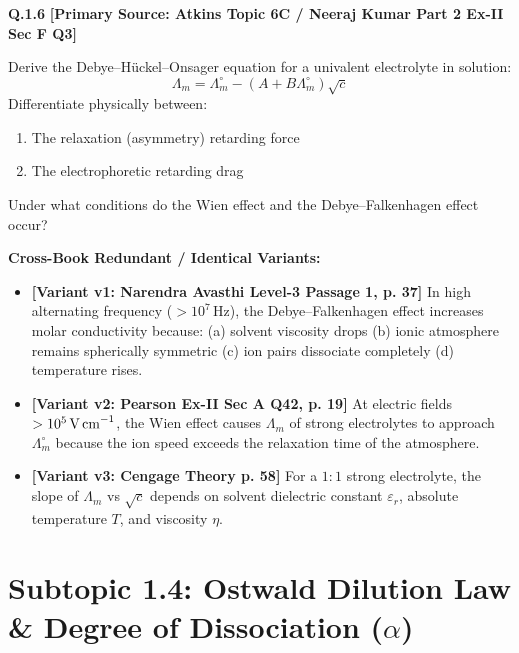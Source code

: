 \begin{problembox}
\textbf{Q.1.6} \hfill \textbf{[Primary Source: Atkins Topic 6C / Neeraj Kumar Part 2 Ex-II Sec F Q3]}
\label{q:qb-c1-06}

Derive the Debye--H\"{u}ckel--Onsager equation for a univalent electrolyte in solution:
\begin{equation*}
    \Lambda_m = \Lambda_m^\circ - (A + B\Lambda_m^\circ)\sqrt{c}
\end{equation*}
Differentiate physically between:
\begin{enumerate}[label=(\alph*)]
    \item The relaxation (asymmetry) retarding force
    \item The electrophoretic retarding drag
\end{enumerate}
Under what conditions do the Wien effect and the Debye--Falkenhagen effect occur?

\tcbline
\textbf{\color{accentamber}Cross-Book Redundant / Identical Variants:}
\begin{itemize}[leftmargin=*,itemsep=2pt]
    \item \textbf{[Variant v1: Narendra Avasthi Level-3 Passage 1, p. 37]} In high alternating frequency ($> 10^7\,\text{Hz}$), the Debye--Falkenhagen effect increases molar conductivity because: (a) solvent viscosity drops (b) ionic atmosphere remains spherically symmetric (c) ion pairs dissociate completely (d) temperature rises.
    \item \textbf{[Variant v2: Pearson Ex-II Sec A Q42, p. 19]} At electric fields $> 10^5\,\text{V\,cm}^{-1}$, the Wien effect causes $\Lambda_m$ of strong electrolytes to approach $\Lambda_m^\circ$ because the ion speed exceeds the relaxation time of the atmosphere.
    \item \textbf{[Variant v3: Cengage Theory p. 58]} For a $1:1$ strong electrolyte, the slope of $\Lambda_m$ vs $\sqrt{c}$ depends on solvent dielectric constant $\varepsilon_r$, absolute temperature $T$, and viscosity $\eta$.
\end{itemize}
\end{problembox}

\section{Subtopic 1.4: Ostwald Dilution Law \& Degree of Dissociation ($\alpha$)}

